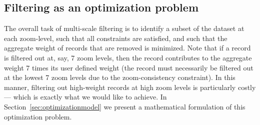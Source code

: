 \subsection{Filtering as an optimization problem}
\label{sec:filtering}

The overall task of multi-scale filtering is to identify a subset of the dataset at each zoom-level, such that all constraints are satisfied, and such that the aggregate weight of records that are removed is minimized. Note that if a record is filtered out at, say, 7 zoom levels, then the record contributes to the aggregate weight 7 times its user defined weight (the record must necessarily be filtered out at the lowest 7 zoom levels due to the zoom-consistency constraint). In this manner, filtering out high-weight records at high zoom levels is particularly costly --- which is exactly what we would like to achieve. In Section~\ref{sec:optimizationmodel} we present a mathematical formulation of this optimization problem.
